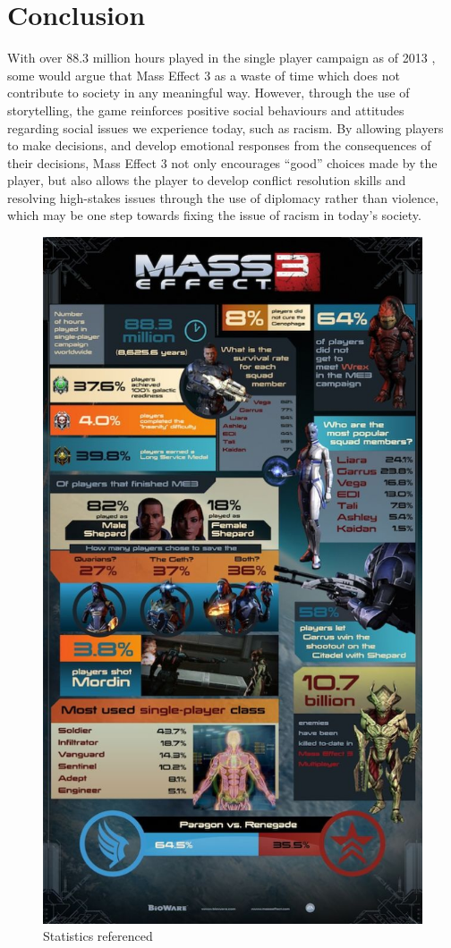 \documentclass[journal]{IEEEtran}
\begin{document}

\section{Conclusion}
With over 88.3 million hours played in the single player campaign as of 2013 \cite{ea},
some would argue that Mass Effect 3 as a waste of time which
does not contribute to society in any meaningful way. However,
through the use of storytelling, the game reinforces positive social behaviours
and attitudes regarding social issues we experience today, such as racism.
By allowing players to make decisions, and develop emotional responses from the
consequences of their decisions,  Mass Effect 3 not only encourages ``good'' choices made by the player, but also allows the player to develop conflict resolution skills and resolving high-stakes issues through the use of diplomacy rather than violence, which may be one step towards fixing the issue of racism
in today's society.
\nocite{*}



\begin{figure}[]
 \includegraphics[width=.45\textwidth]{stat.jpg}
 \caption{Statistics referenced \cite{ea}}
\end{figure}
\end{document}
